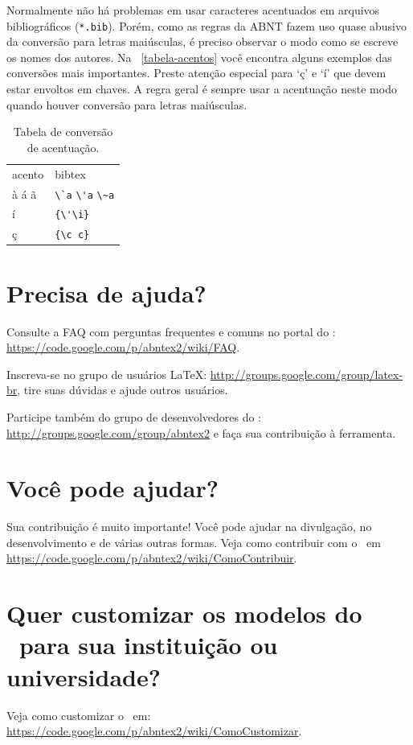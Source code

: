 Normalmente não há problemas em usar caracteres acentuados em arquivos
bibliográficos (\texttt{*.bib}). Porém, como as regras da ABNT fazem uso quase
abusivo da conversão para letras maiúsculas, é preciso observar o modo como se
escreve os nomes dos autores. Na ~\autoref{tabela-acentos} você encontra alguns
exemplos das conversões mais importantes. Preste atenção especial para `ç' e `í'
que devem estar envoltos em chaves. A regra geral é sempre usar a acentuação
neste modo quando houver conversão para letras maiúsculas.

\begin{table}[htbp]
\caption{Tabela de conversão de acentuação.}
\label{tabela-acentos}

\begin{center}
\begin{tabular}{ll}\hline\hline
acento & \textsf{bibtex}\\
à á ã & \verb+\`a+ \verb+\'a+ \verb+\~a+\\
í & \verb+{\'\i}+\\
ç & \verb+{\c c}+\\
\hline\hline
\end{tabular}
\end{center}
\end{table}


\section{Precisa de ajuda?}

Consulte a FAQ com perguntas frequentes e comuns no portal do \abnTeX:
\url{https://code.google.com/p/abntex2/wiki/FAQ}.

Inscreva-se no grupo de usuários \LaTeX:
\url{http://groups.google.com/group/latex-br}, tire suas dúvidas e ajude
outros usuários.

Participe também do grupo de desenvolvedores do \abnTeX:
\url{http://groups.google.com/group/abntex2} e faça sua contribuição à
ferramenta.

\section{Você pode ajudar?}

Sua contribuição é muito importante! Você pode ajudar na divulgação, no
desenvolvimento e de várias outras formas. Veja como contribuir com o \abnTeX\
em \url{https://code.google.com/p/abntex2/wiki/ComoContribuir}.

\section{Quer customizar os modelos do \abnTeX\ para sua instituição ou
universidade?}

Veja como customizar o \abnTeX\ em:
\url{https://code.google.com/p/abntex2/wiki/ComoCustomizar}.

